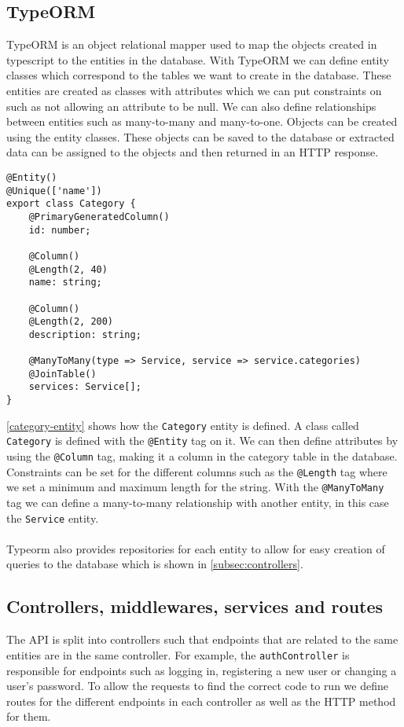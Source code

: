 \subsection{TypeORM}
TypeORM is an object relational mapper used to map the objects created in typescript to the entities in the database.
With TypeORM we can define entity classes which correspond to the tables we want to create in the database.
These entities are created as classes with attributes which we can put constraints on such as not allowing an attribute to be null. 
We can also define relationships between entities such as many-to-many and many-to-one.
Objects can be created using the entity classes. 
These objects can be saved to the database or extracted data can be assigned to the objects and then returned in an HTTP response. 

\begin{lstlisting}[caption={The category entity and its attributes}, captionpos=b, label={category-entity}]
@Entity()
@Unique(['name'])
export class Category {
	@PrimaryGeneratedColumn()
	id: number;

	@Column()
	@Length(2, 40)
	name: string;

	@Column()
	@Length(2, 200)
	description: string;

	@ManyToMany(type => Service, service => service.categories)
	@JoinTable()
	services: Service[];
}
\end{lstlisting}
\autoref{category-entity} shows how the \texttt{Category} entity is defined. A class called \texttt{Category} is defined with the \texttt{@Entity} tag on it. 
We can then define attributes by using the \texttt{@Column} tag, making it a column in the category table in the database. 
Constraints can be set for the different columns such as the \texttt{@Length} tag where we set a minimum and maximum length for the string.
With the \texttt{@ManyToMany} tag we can define a many-to-many relationship with another entity, in this case the \texttt{Service} entity. 
\\\\
Typeorm also provides repositories for each entity to allow for easy creation of queries to the database which is shown in \autoref{subsec:controllers}.

\subsection{Controllers, middlewares, services and routes}\label{subsec:controllers}

The API is split into controllers such that endpoints that are related to the same entities are in the same controller. 
For example, the \texttt{authController} is responsible for endpoints such as logging in, registering a new user or changing a user's password.
To allow the requests to find the correct code to run we define routes for the different endpoints in each controller as well as the HTTP method for them.

